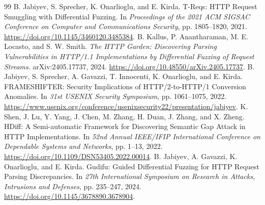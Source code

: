 \documentclass[11pt,letterpaper]{article}
\begin{document}
\begin{thebibliography}{99}
 B. Jabiyev, S. Sprecher, K. Onarlioglu, and E. Kirda. T-Reqs: HTTP Request Smuggling with Differential Fuzzing. In \emph{Proceedings of the 2021 ACM SIGSAC Conference on Computer and Communications Security}, pp. 1805--1820, 2021. \url{https://doi.org/10.1145/3460120.3485384}.
 B. Kallus, P. Anantharaman, M. E. Locasto, and S. W. Smith. \emph{The HTTP Garden: Discovering Parsing Vulnerabilities in HTTP/1.1 Implementations by Differential Fuzzing of Request Streams}. arXiv:2405.17737, 2024. \url{https://doi.org/10.48550/arXiv.2405.17737}.
 B. Jabiyev, S. Sprecher, A. Gavazzi, T. Innocenti, K. Onarlioglu, and E. Kirda. FRAMESHIFTER: Security Implications of HTTP/2-to-HTTP/1 Conversion Anomalies. In \emph{31st USENIX Security Symposium}, pp. 1061--1075, 2022. \url{https://www.usenix.org/conference/usenixsecurity22/presentation/jabiyev}.
 K. Shen, J. Lu, Y. Yang, J. Chen, M. Zhang, H. Duan, J. Zhang, and X. Zheng. HDiff: A Semi-automatic Framework for Discovering Semantic Gap Attack in HTTP Implementations. In \emph{52nd Annual IEEE/IFIP International Conference on Dependable Systems and Networks}, pp. 1--13, 2022. \url{https://doi.org/10.1109/DSN53405.2022.00014}.
 B. Jabiyev, A. Gavazzi, K. Onarlioglu, and E. Kirda. Gudifu: Guided Differential Fuzzing for HTTP Request Parsing Discrepancies. In \emph{27th International Symposium on Research in Attacks, Intrusions and Defenses}, pp. 235--247, 2024. \url{https://doi.org/10.1145/3678890.3678904}.
\end{thebibliography}
\end{document}
